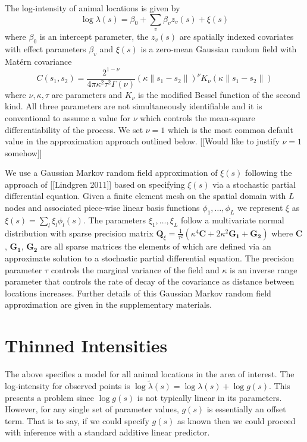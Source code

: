 \documentclass[preprint,12pt]{elsarticle}
\newcommand{\bm}{\boldsymbol}  %
\newcommand{\tl}{\tilde{\lambda}}   %
\begin{document}
The log-intensity of animal locations is given by
\begin{equation*}
\log \lambda(s) = \beta_0 + \sum_v \beta_v z_v(s) + \xi(s)
\end{equation*}
where $\beta_0$ is an intercept parameter, the $z_v(s)$ are spatially indexed covariates with effect parameters $\beta_v$ and $\xi(s)$ is a zero-mean Gaussian random field with Mat\'ern covariance
\begin{equation}
C(s_1,s_2) = \frac{2^{1-\nu}}{4\pi\kappa^2\tau^2\Gamma(\nu)}(\kappa \|s_1-s_2\|)^{\nu}K_\nu(\kappa \|s_1-s_2\|)
\end{equation}
where \(\nu, \kappa, \tau\) are parameters and \(K_{\nu}\) is the modified Bessel function of the second kind.  All three parameters are not simultaneously identifiable and it is conventional to assume a value for $\nu$ which controls the mean-square differentiability of the process.  We set $\nu = 1$ which is the most common default value in the approximation approach outlined below.  [[Would like to justify $\nu = 1$ somehow]]

We use a Gaussian Markov random field approximation of $\xi(s)$ following the approach of [[Lindgren 2011]] based on specifying $\xi(s)$ via a stochastic partial differential equation.  Given a finite element mesh on the spatial domain with $L$ nodes and associated piece-wise linear basis functions $\phi_1, \ldots, \phi_L$ we represent $\xi$ as $\xi(s) = \sum_l \xi_l \phi_l(s)$.  The parameters $\xi_1, \ldots, \xi_L$ follow a multivariate normal distribution with sparse precision matrix $\bm{Q}_{\xi} = \frac{1}{\tau^2}\left(\kappa^4\bm{C} + 2\kappa^2\bm{G_1} + \bm{G_2}\right)$ where $\bm{C}$, $\bm{G_1}$, $\bm{G_2}$ are all sparse matrices the elements of which are defined via an approximate solution to a stochastic partial differential equation. The precision parameter $\tau$ controls the marginal variance of the field and $\kappa$ is an inverse range parameter that controls the rate of decay of the covariance as distance between locations increases.  Further details of this Gaussian Markov random field approximation are given in the supplementary materials. 

\section*{Thinned Intensities} 

The above specifies a model for all animal locations in the area of interest.  The log-intensity for observed points is $\log\tl(s) = \log\lambda(s) + \log g(s)$.  This presents a problem since $\log g(s)$ is not typically linear in its parameters. However, for any single set of parameter values, $g(s)$ is essentially an offset term.  That is to say, if we could specify $g(s)$ as known then we could proceed with inference with a standard additive linear predictor.   
\end{document}
